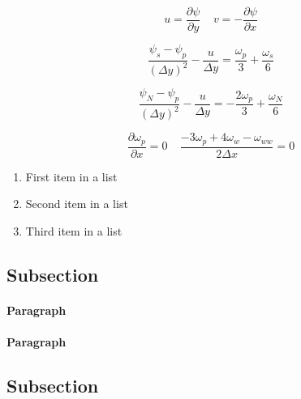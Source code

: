 \documentclass[fleqn,12pt]{NTFD} %
\begin{document}
\begin{equation}
u = \frac{\partial \psi}{\partial y} \:\:\:\:\:	v = -\frac{\partial \psi}{\partial x}
\label{eq:defStreamm}
\end{equation}

\begin{equation}
\frac{\psi_{s} - \psi_{p} }{(\Delta y)^2} -\frac{u}{\Delta y} = \frac{\omega_{p} }{3} + \frac{\omega_{s} }{6}
\label{eq:north}
\end{equation}

\begin{equation}
\frac{\psi_{N} - \psi_{p} }{(\Delta y)^2} -\frac{u}{\Delta y} = - \frac{2 \omega_{p} }{3} + \frac{\omega_{N} }{6}
\label{eq:south}
\end{equation}

\begin{equation}
\frac{\partial\omega_{p}}{\partial x} =0 \:\:\:\:\: \frac{-3 \omega_{p} +4\omega_{w} -\omega_{ww} }{2\Delta x} = 0
\label{eq:outlet}
\end{equation}



\lipsum[4] %



\lipsum[5] %

\begin{enumerate}[noitemsep] %
\item First item in a list
\item Second item in a list
\item Third item in a list
\end{enumerate}

\subsection{Subsection}

\lipsum[6] %

\paragraph{Paragraph} \lipsum[7] %
\paragraph{Paragraph} \lipsum[8] %

\subsection{Subsection}
\end{document}
